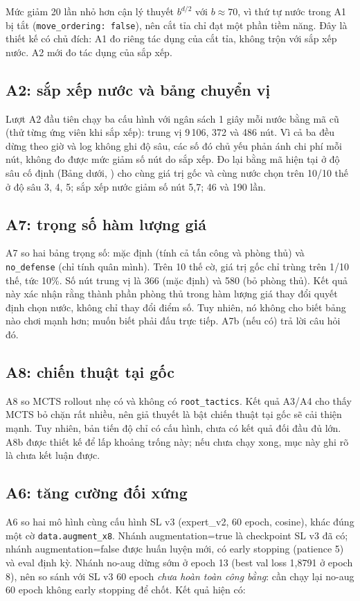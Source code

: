 Mức giảm 20 lần nhỏ hơn cận lý thuyết $b^{d/2}$ với $b\approx 70$, vì thứ tự nước trong A1 bị
tắt (\texttt{move\_ordering: false}), nên cắt tỉa chỉ đạt một phần tiềm năng. Đây là thiết kế
có chủ đích: A1 đo riêng tác dụng của cắt tỉa, không trộn với sắp xếp nước. A2 mới đo tác dụng
của sắp xếp.

\subsection{A2: sắp xếp nước và bảng chuyển vị}
Lượt A2 đầu tiên chạy ba cấu hình với ngân sách 1 giây mỗi nước bằng mã cũ (thử từng ứng viên khi
sắp xếp): trung vị 9\,106, 372 và 486 nút. Vì cả ba đều dừng theo giờ và log không ghi độ sâu, các số
đó chủ yếu phản ánh chi phí mỗi nút, không đo được mức giảm số nút do sắp xếp. Đo lại bằng mã hiện tại
ở độ sâu cố định (Bảng dưới, ) cho cùng giá trị gốc và cùng nước
chọn trên 10/10 thế ở độ sâu 3, 4, 5; sắp xếp nước giảm số nút 5,7; 46 và 190 lần.


\subsection{A7: trọng số hàm lượng giá}
A7 so hai bảng trọng số: mặc định (tính cả tấn công và phòng thủ) và \texttt{no\_defense} (chỉ
tính quân mình). Trên 10 thế cờ, giá trị gốc chỉ trùng trên 1/10 thế, tức 10\%. Số nút trung
vị là 366 (mặc định) và 580 (bỏ phòng thủ). Kết quả này xác nhận rằng thành phần phòng thủ
trong hàm lượng giá thay đổi quyết định chọn nước, không chỉ thay đổi điểm số. Tuy nhiên, nó
không cho biết bảng nào chơi mạnh hơn; muốn biết phải đấu trực tiếp. A7b (nếu có) trả lời câu
hỏi đó.

\subsection{A8: chiến thuật tại gốc}
A8 so MCTS rollout nhẹ có và không có \texttt{root\_tactics}. Kết quả A3/A4 cho thấy MCTS bỏ
chặn rất nhiều, nên giả thuyết là bật chiến thuật tại gốc sẽ cải thiện mạnh. Tuy nhiên, bản
tiến độ chỉ có cấu hình, chưa có kết quả đối đầu đủ lớn. A8b được thiết kế để lấp khoảng trống
này; nếu chưa chạy xong, mục này ghi rõ là chưa kết luận được.

\subsection{A6: tăng cường đối xứng}
A6 so hai mô hình cùng cấu hình SL v3 (expert\_v2, 60 epoch, cosine), khác đúng một cờ
\texttt{data.augment\_x8}. Nhánh augmentation=true là checkpoint SL v3 đã có; nhánh
augmentation=false được huấn luyện mới, có early stopping (patience 5) và eval định kỳ. Nhánh
no-aug dừng sớm ở epoch 13 (best val loss 1,8791 ở epoch 8), nên so sánh với SL v3 60 epoch
\emph{chưa hoàn toàn công bằng}: cần chạy lại no-aug 60 epoch không early stopping để chốt.
Kết quả hiện có:

